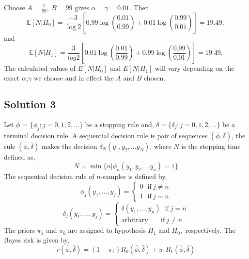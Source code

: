 \documentclass[a4paper,english,12pt]{article}
\begin{document}
Choose$ \;A=\frac{1}{99},~B=99$ gives $\alpha=\gamma=0.01$. Then 
\begin{equation*}
\mathbb{E}[N| H_0]= \frac{-3}{\log2}[0.99\log(\frac{0.01}{0.99})+0.01\log(\frac{0.99}{0.01})]=19.49,
\end{equation*}
and
\begin{equation*}
\mathbb{E}[N| H_1]= \frac{3}{log2}[0.01\log(\frac{0.01}{0.99})+0.99
\log(\frac{0.99}{0.01})]=19.49.
\end{equation*}
The calculated values of $E[N| H_0]$ and $E[N| H_1]$ will vary depending on the exact $\alpha$,$\gamma$ we choose and in effect the $A$ and $B$ chosen.
\hypertarget{solution3}{\subsection*{Solution 3}}
Let $\bar{\phi}$ = $\{\phi_{j};j=0,1,2,...\}$ be a stopping rule and, $\bar{\delta}=\{\delta_{j};j=0,1,2,...\}$ be a terminal decision rule. A sequential decision rule is pair of sequences $(\bar{\phi},\bar{\delta})$, the rule $(\bar{\phi},\bar{\delta})$ makes the  decision $\delta_{N}(y_{1},y_{2},...y_{N})$, where $N$ is the stopping time defined as,
\begin{equation}
N=\min\{n| \phi_{n}(y_{1},y_{2},...y_{n})=1\}
\end{equation}
The sequential decision rule of $n$-samples is defined by,
\begin{equation*}
\phi_j(y_1,\dots,y_j)=\begin{cases}
0~\hspace{5pt}\mbox{if}~j\neq n\\
1~\hspace{5pt}\mbox{if}~j= n
\end{cases}
\end{equation*}
\begin{equation*}
\delta_j(y_1,\dots,y_j)=\begin{cases}
\delta(y_1,\dots,y_n)~\hspace{5pt}\mbox{if}~j= n\\
\mbox{arbitrary}~\hspace{20pt}\mbox{if}~j\neq n
\end{cases}
\end{equation*}
The priors $ \pi_{1}$ and $ \pi_{0}$ are assigned to hypothesis $ H_{1} $ and $H_{0},$ respectively. The Bayes risk is given by,
\begin{equation*}
r(\bar{\phi},\bar{\delta})=(1-\pi_1)R_0(\bar{\phi},\bar{\delta})+\pi_1 R_1(\bar{\phi},\bar{\delta})
\end{equation*}
\end{document}
